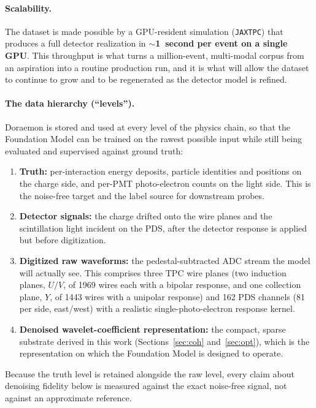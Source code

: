 \documentclass[11pt]{article}
\begin{document}
\paragraph{Scalability.} The dataset is made possible by a GPU-resident simulation
(\texttt{JAXTPC}) that produces a full detector realization in \textbf{$\sim$1~second per
event on a single GPU}. This throughput is what turns a million-event, multi-modal corpus
from an aspiration into a routine production run, and it is what will allow the dataset to
continue to grow and to be regenerated as the detector model is refined.

\paragraph{The data hierarchy (``levels'').} Doraemon is stored and used at every level of
the physics chain, so that the Foundation Model can be trained on the rawest possible input
while still being evaluated and supervised against ground truth:
\begin{enumerate}\setlength{\itemsep}{2pt}
    \item \textbf{Truth:} per-interaction energy deposits, particle identities and
    positions on the charge side, and per-PMT photo-electron counts on the light side. This
    is the noise-free target and the label source for downstream probes.
    \item \textbf{Detector signals:} the charge drifted onto the wire planes and the
    scintillation light incident on the PDS, after the detector response is applied but
    before digitization.
    \item \textbf{Digitized raw waveforms:} the pedestal-subtracted ADC stream the model
    will actually see. This comprises three TPC wire planes (two induction planes, $U/V$, of
    1969 wires each with a bipolar response, and one collection plane, $Y$, of 1443 wires
    with a unipolar response) and 162 PDS channels (81 per side, east/west) with a realistic
    single-photo-electron response kernel.
    \item \textbf{Denoised wavelet-coefficient representation:} the compact, sparse
    substrate derived in this work (Sections~\ref{sec:coh} and~\ref{sec:opt}), which is the
    representation on which the Foundation Model is designed to operate.
\end{enumerate}
Because the truth level is retained alongside the raw level, every claim about denoising
fidelity below is measured against the exact noise-free signal, not against an approximate
reference.
\end{document}
